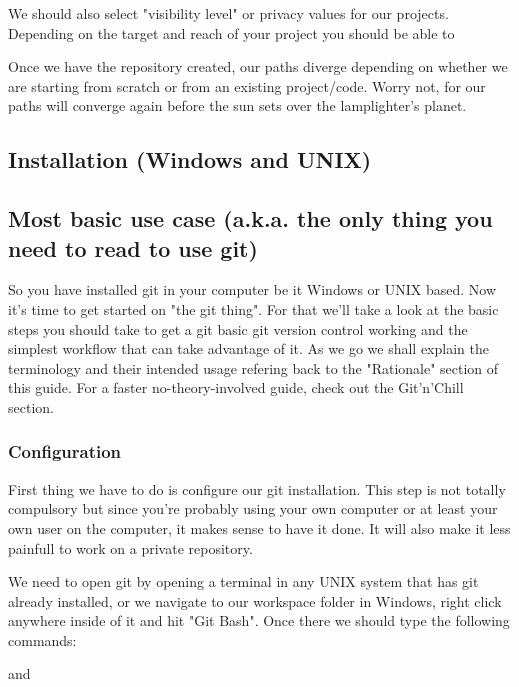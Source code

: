 \documentclass[runningheads,a4paper]{llncs}
\begin{document}
We should also select "visibility level" or privacy values for our projects. Depending on the target and reach of your project you should be able to

Once we have the repository created, our paths diverge depending on whether we are starting from scratch or from an existing project/code. Worry not, for our paths will converge again before the sun sets over the lamplighter's planet.


\subsection{Installation (Windows and UNIX)}

\subsection{Most basic use case (a.k.a. the only thing you need to read to use git)}

So you have installed git in your computer be it Windows or UNIX based. Now it's time to get started on "the git thing". For that we'll take a look at the basic steps you should take to get a git basic git version control working and the simplest workflow that can take advantage of it. As we go we shall explain the terminology and their intended usage refering back to the "Rationale" section of this guide. For a faster no-theory-involved guide, check out the Git'n'Chill section.

\subsubsection{Configuration}


First thing we have to do is configure our git installation. This step is not totally compulsory but since you're probably using your own computer or at least your own user on the computer, it makes sense to have it done. It will also make it less painfull to work on a private repository.

We need to open git by opening a terminal in any UNIX system that has git already installed, or we navigate to our workspace folder in Windows, right click anywhere inside of it and hit "Git Bash". Once there we should type the following commands: \newline

         \newline
        
and \newline
\end{document}
